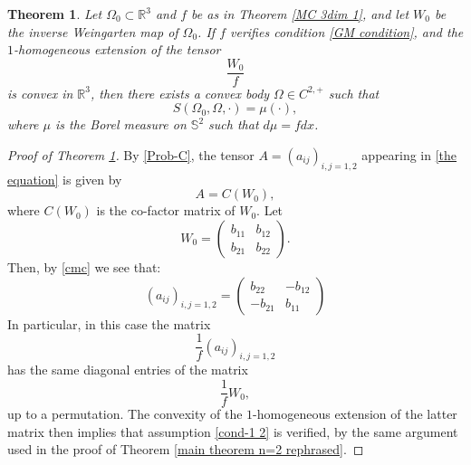 \documentclass[10pt,a4paper]{amsart}
\newtheorem{thm}{Theorem}
\newcommand{\R}{\mathbb R}
\newcommand{\s}{\mathbb S}
\begin{document}
\begin{thm}\label{MC 3dim} Let $\Omega_0\subset\R^3$ and $f$ be as in Theorem \ref{MC 3dim 1}, and let $W_0$ be the inverse Weingarten map of $\Omega_0$. If $f$ verifies condition \eqref{GM condition}, and the $1$-homogeneous extension of the tensor 
$$
\frac{W_0}{f}
$$
is convex in $\R^3$, then there exists a convex body $\Omega\in C^{2,+}$ such that
$$
S(\Omega_0,\Omega,\cdot)=\mu(\cdot),
$$
where $\mu$ is the Borel measure on $\s^2$ such that $d\mu=f dx$.
\end{thm}

\begin{proof}[Proof of Theorem \ref{MC 3dim}] 
By \eqref{Prob-C}, the tensor $A=(a_{ij})_{i,j=1,2}$ appearing in \eqref{the equation} is given by
$$
A=C(W_0),
$$
where $C(W_0)$ is the co-factor matrix of $W_0$. Let
$$
W_0=
\left(
\begin{array}{cc}
b_{11}     &b_{12}  \\
b_{21}     &b_{22} 
\end{array}
\right).
$$
Then, by \eqref{cmc} we see that:
$$
(a_{ij})_{i,j=1,2}=
\left(
\begin{array}{cc}
b_{22}      &-b_{12}  \\
-b_{21}     &b_{11} 
\end{array}
\right)
$$
In particular, in this case the matrix 
$$
\frac1f(a_{ij})_{i,j=1,2}
$$ 
has the same diagonal entries of the matrix 
$$
\frac1f W_0,
$$ 
up to a permutation. The convexity of the $1$-homogeneous extension of the latter matrix then implies that assumption 
\eqref{cond-1 2} is verified, by the same argument used in the proof of Theorem \ref{main theorem n=2 rephrased}.
\end{proof}
\end{document}
